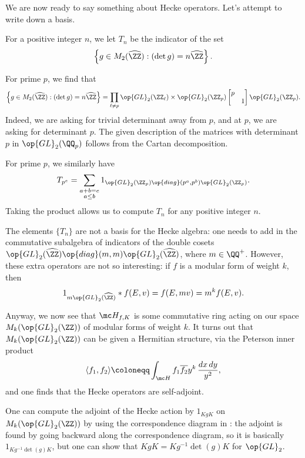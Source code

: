 \documentclass[../notes.tex]{subfiles}
\begin{document}
We are now ready to say something about Hecke operators. Let's attempt to write down a basis.
\begin{notation}
	For a positive integer $n$, we let $T_n$ be the indicator of the set
	\[\left\{g\in M_2(\widehat\ZZ):(\det g)=n\widehat\ZZ\right\}.\]
\end{notation}
\begin{example}
	For prime $p$, we find that
	\[\left\{g\in M_2(\widehat\ZZ):(\det g)=n\widehat\ZZ\right\}=\prod_{\ell\ne p}\op{GL}_2(\ZZ_\ell)\times\op{GL}_2(\ZZ_p)\begin{bmatrix}
		p \\ & 1
	\end{bmatrix}\op{GL}_2(\ZZ_p).\]
	Indeed, we are asking for trivial determinant away from $p$, and at $p$, we are asking for determinant $p$. The given description of the matrices with determinant $p$ in $\op{GL}_2(\QQ_p)$ follows from the Cartan decomposition.
\end{example}
\begin{example}
	For prime $p$, we similarly have
	\[T_{p^e}=\sum_{\substack{a+b=e \\a\le b}}1_{\op{GL}_2(\ZZ_p)\op{diag}\left(p^a,p^b\right)\op{GL}_2(\ZZ_p)}.\]
	Taking the product allows us to compute $T_n$ for any positive integer $n$.
\end{example}
\begin{remark}
	The elements $\{T_n\}$ are not a basis for the Hecke algebra: one needs to add in the commutative subalgebra of indicators of the double cosets $\op{GL}_2(\widehat\ZZ)\op{diag}(m,m)\op{GL}_2(\widehat\ZZ)$, where $m\in\QQ^+$. However, these extra operators are not so interesting: if $f$ is a modular form of weight $k$, then
	\[1_{m\op{GL}_2(\widehat\ZZ)}*f(E,v)=f(E,mv)=m^kf(E,v).\]
\end{remark}
Anyway, we now see that $\mc H_{f,K}$ is some commutative ring acting on our space $M_k(\op{GL}_2(\ZZ))$ of modular forms of weight $k$. It turns out that $M_k(\op{GL}_2(\ZZ))$ can be given a Hermitian structure, via the Peterson inner product
\[\langle f_1,f_2\rangle\coloneqq\int_{\mc H}f_1\overline{f_2}y^k\,\frac{dx\,dy}{y^2},\]
and one finds that the Hecke operators are self-adjoint.
\begin{remark}
	One can compute the adjoint of the Hecke action by $1_{KgK}$ on $M_k(\op{GL}_2(\ZZ))$ by using the correspondence diagram in : the adjoint is found by going backward along the correspondence diagram, so it is basically $1_{Kg^{-1}\det(g)K}$, but one can show that $KgK=Kg^{-1}\det(g)K$ for $\op{GL}_2$.
\end{remark}
\end{document}
